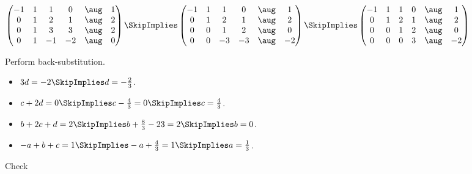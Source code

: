 \documentclass[oneside,12pt]{amsart}
\begin{document}
$
\begin{pmatrix}
 -1  &  1 &  1 &  0 & \aug &  1  \\
  0  &  1 &  2 &  1 & \aug &  2  \\
  0  &  1 &  3 &  3 & \aug &  2  \\
  0  &  1 & -1 & -2 & \aug &  0  \\
\end{pmatrix}
\SkipImplies
\begin{pmatrix}
 -1  &  1 &  1 &  0 & \aug &  1  \\
  0  &  1 &  2 &  1 & \aug &  2  \\
  0  &  0 &  1 &  2 & \aug &  0  \\
  0  &  0 & -3 & -3 & \aug &  -2  \\
\end{pmatrix}
\SkipImplies
\begin{pmatrix}
 -1  &  1 &  1 &  0 & \aug &  1  \\
  0  &  1 &  2 &  1 & \aug &  2  \\
  0  &  0 &  1 &  2 & \aug &  0  \\
  0  &  0 &  0 &  3 & \aug &  -2  \\
\end{pmatrix}
$

\bigskip

Perform back-substitution.

\begin{itemize}
\item $3d=-2 \SkipImplies d = -\frac{2}{3}$.
\item $c+2d=0 \SkipImplies c - \frac{4}{3} = 0 \SkipImplies c = \frac{4}{3}$.
\item $b + 2c +d =2 \SkipImplies b + \frac{8}{3} - {2}{3} = 2 \SkipImplies b = 0$.
\item $-a + b  + c = 1 \SkipImplies -a + \frac{4}{3} = 1 \SkipImplies a = \frac{1}{3}$.
\end{itemize}

\bigskip

Check

\bigskip
\end{document}
